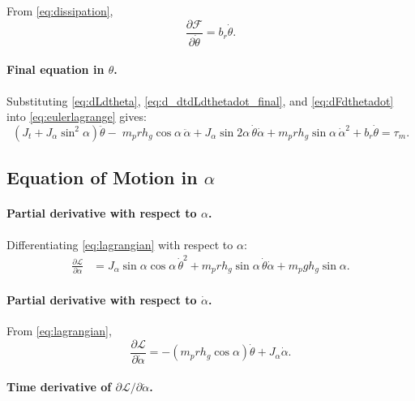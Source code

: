 \documentclass[12pt,a4paper]{article}
\begin{document}
From \eqref{eq:dissipation},
\begin{equation}
\frac{\partial\mathcal{F}}{\partial\dot\theta}=b_r\dot\theta.
\label{eq:dFdthetadot}
\end{equation}

\paragraph{Final equation in $\theta$.}

Substituting \eqref{eq:dLdtheta}, \eqref{eq:d_dtdLdthetadot_final}, and \eqref{eq:dFdthetadot} into \eqref{eq:eulerlagrange} gives:
\begin{equation}
\boxed{
\left(J_t+J_\alpha\sin^2\alpha\right)\ddot\theta
-\;m_p r h_g\cos\alpha\,\ddot\alpha
+J_\alpha\sin 2\alpha\,\dot\theta\dot\alpha
+m_p r h_g\sin\alpha\,\dot\alpha^2
+b_r\dot\theta
=
\tau_m.
}
\label{eq:lagrangiantheta}
\end{equation}

\subsection{Equation of Motion in $\alpha$}

\paragraph{Partial derivative with respect to $\alpha$.}

Differentiating \eqref{eq:lagrangian} with respect to $\alpha$:
\begin{align}
\frac{\partial\mathcal{L}}{\partial\alpha}
&=
J_\alpha\sin\alpha\cos\alpha\,\dot\theta^2
+m_p r h_g\sin\alpha\,\dot\theta\dot\alpha
+m_p g h_g\sin\alpha.
\label{eq:dLdalpha}
\end{align}

\paragraph{Partial derivative with respect to $\dot\alpha$.}

From \eqref{eq:lagrangian},
\begin{equation}
\frac{\partial\mathcal{L}}{\partial\dot\alpha}
=
-\left(m_p r h_g\cos\alpha\right)\dot\theta
+J_\alpha\dot\alpha.
\label{eq:dLdalphadot}
\end{equation}

\paragraph{Time derivative of $\partial\mathcal{L}/\partial\dot\alpha$.}
\end{document}
